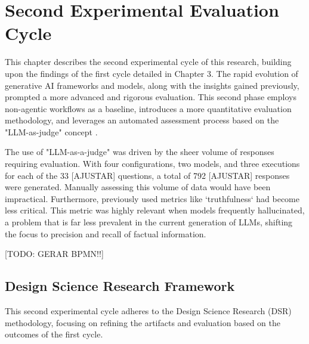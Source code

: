 

\chapter{Second Experimental Evaluation Cycle}
\label{chap:second_experiment}

This chapter describes the second experimental cycle of this research, building upon the findings of the first cycle detailed in Chapter 3. The rapid evolution of generative AI frameworks and models, along with the insights gained previously, prompted a more advanced and rigorous evaluation. This second phase employs non-agentic workflows as a baseline, introduces a more quantitative evaluation methodology, and leverages an automated assessment process based on the "LLM-as-judge" concept \citep{Gu2025}.

The use of "LLM-as-a-judge" was driven by the sheer volume of responses requiring evaluation. With four configurations, two models, and three executions for each of the 33 [AJUSTAR] questions, a total of 792 [AJUSTAR] responses were generated. Manually assessing this volume of data would have been impractical. Furthermore, previously used metrics like `truthfulness` had become less critical. This metric was highly relevant when models frequently hallucinated, a problem that is far less prevalent in the current generation of LLMs, shifting the focus to precision and recall of factual information.

[TODO: GERAR BPMN!!]

\section{Design Science Research Framework}

    This second experimental cycle adheres to the Design Science Research (DSR) methodology, focusing on refining the artifacts and evaluation based on the outcomes of the first cycle.

